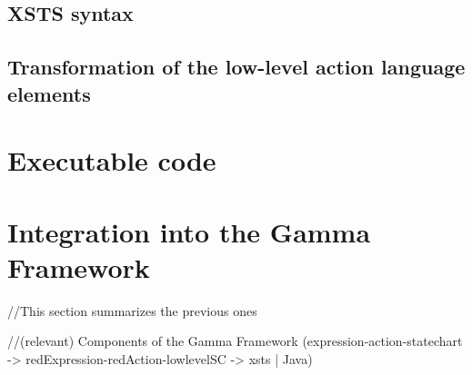 \subsection{XSTS syntax}


\subsection{Transformation of the low-level action language elements}


\section{Executable code} \label{section_tr_java}


\section{Integration into the Gamma Framework} \label{section_tr_integration}
//This section summarizes the previous ones

//(relevant) Components of the Gamma Framework (expression-action-statechart -> redExpression-redAction-lowlevelSC -> xsts | Java)